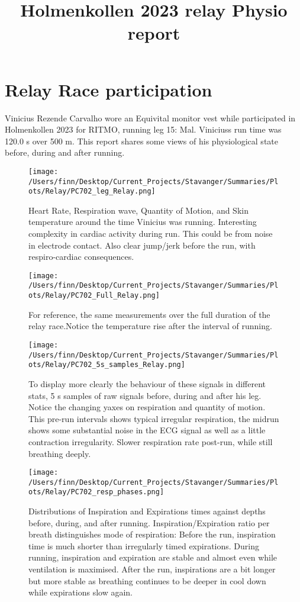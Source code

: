 \title{Holmenkollen 2023 relay Physio report}
 \maketitle
\section*{Relay Race participation}
 Vinicius Rezende Carvalho wore an Equivital monitor vest while participated in Holmenkollen 2023 for RITMO, running leg 15: Mal. 
 Viniciuss run time was 120.0 s over 500 m. This report shares some views of his physiological state before, during and after running. 
\begin{figure}[h]
\texttt{[image: /Users/finn/Desktop/Current\_Projects/Stavanger/Summaries/Plots/Relay/PC702\_leg\_Relay.png]}
\caption{Heart Rate, Respiration wave, Quantity of Motion, and Skin temperature around the time Vinicius was running. Interesting complexity in cardiac activity during run. This could be from noise in electrode contact. Also clear jump/jerk before the run, with respiro-cardiac consequences.}
\label{leg}
\end{figure}
\begin{sidewaysfigure}[h]
\texttt{[image: /Users/finn/Desktop/Current\_Projects/Stavanger/Summaries/Plots/Relay/PC702\_Full\_Relay.png]}
\caption{For reference, the same measurements over the full duration of the relay race.Notice the temperature rise after the interval of running.}
\label{Full}
\end{sidewaysfigure}
\begin{figure}[h]
\texttt{[image: /Users/finn/Desktop/Current\_Projects/Stavanger/Summaries/Plots/Relay/PC702\_5s\_samples\_Relay.png]}
\caption{To display more clearly the behaviour of these signals in different stats, 5 s samples of raw signals before, during and after his leg. Notice the changing yaxes on respiration and quantity of motion. This pre-run intervals shows typical irregular respiration, the midrun shows some substantial noise in the ECG signal as well as a little contraction irregularity. Slower respiration rate post-run, while still breathing deeply.}
\label{5s}
\end{figure}
\begin{figure}[h]
\texttt{[image: /Users/finn/Desktop/Current\_Projects/Stavanger/Summaries/Plots/Relay/PC702\_resp\_phases.png]}
\caption{Distributions of Inspiration and Expirations times against depths before, during, and after running. Inspiration/Expiration ratio per breath distinguishes mode of respiration: Before the run, inspiration time is much shorter than irregularly timed expirations. During running, inspiration and expiration are stable and almost even while ventilation is maximised. After the run, inspirations are a bit longer but more stable as breathing continues to be deeper in cool down while expirations slow again.}
\label{resp}
\end{figure}


